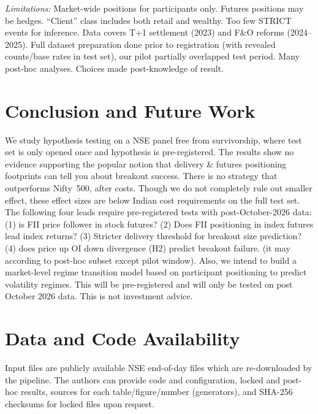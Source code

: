 \documentclass[conference]{IEEEtran}
\begin{document}
\emph{Limitations:} Market-wide positions for participants only. Futures positions may be hedges.
``Client'' class includes both retail and wealthy. Too few STRICT events for inference. Data covers T+1
settlement (2023) and F\&O reforms (2024--2025). Full dataset preparation done prior to registration (with
revealed counts/base rates in test set), our pilot partially overlapped test period. Many post-hoc analyses.
Choices made post-knowledge of result.

\section{Conclusion and Future Work}
We study hypothesis testing on a NSE panel free from survivorship, where test set is only opened once and
hypothesis is pre-registered. The results show no evidence supporting the popular notion that delivery \&
futures positioning footprints can tell you about breakout success. There is no strategy that outperforms
Nifty~500, after costs. Though we do not completely rule out smaller effect, these effect sizes are below
Indian cost requirements on the full test set. The following four leads require pre-registered tests with
post-October-2026 data: (1) is FII price follower in stock futures? (2) Does FII positioning in index futures
lead index returns? (3) Stricter delivery threshold for breakout size prediction? (4) does price up OI down
divergence (H2) predict breakout failure. (it may according to post-hoc subset except pilot window). Also, we
intend to build a market-level regime transition model based on participant positioning to predict volatility
regimes. This will be pre-registered and will only be tested on post October 2026 data. This is not investment
advice.

\section*{Data and Code Availability}
Input files are publicly available NSE end-of-day files which are re-downloaded by the pipeline. The authors
can provide code and configuration, locked and post-hoc results, sources for each table/figure/number
(generators), and SHA-256 checksums for locked files upon request.
\end{document}

